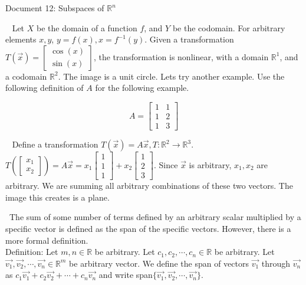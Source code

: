 \documentclass[11pt]{article}
\begin{document}
\begin{center}
Document 12: Subspaces of $\mathbb{R}^n$
\end{center}

\setlength{\leftskip}{0in}
$\,\,\,$ Let $X$ be the domain of a function $f$, and $Y$ be the codomain. For arbitrary elements $x,y$, $y=f(x),x=f^{-1}(y)$. Given a transformation $T(\vec{x})=\begin{bmatrix}\cos(x)\\\sin(x)\end{bmatrix}$, the transformation is nonlinear, with a domain $\mathbb{R}^1$, and a codomain $\mathbb{R}^2$. The image is a unit circle. Lets try another example. Use the following definition of $A$ for the following example.

$$A=\begin{bmatrix}
1 & 1\\1 & 2\\1 & 3
\end{bmatrix}$$

$\,\,\,$ Define a transformation $T(\vec{x})=A\vec{x},T:\mathbb{R}^2\rightarrow\mathbb{R}^3$. $T\left(\begin{bmatrix}x_1\\x_2\end{bmatrix}\right)=A\vec{x}=x_1\begin{bmatrix}1\\1\\1\end{bmatrix}+x_2\begin{bmatrix}1\\2\\3\end{bmatrix}$. Since $\vec{x}$ is arbitrary, $x_1,x_2$ are arbitrary. We are summing all arbitrary combinations of these two vectors. The image this creates is a plane.

$\,\,\,$The sum of some number of terms defined by an arbitrary scalar multiplied by a specific vector is defined as the span of the specific vectors. However, there is a more formal definition.\\

Definition: Let $m,n\in\mathbb{R}$ be arbitrary. Let $c_1,c_2,\cdots,c_n\in\mathbb{R}$ be arbitrary. Let $\vec{v_1},\vec{v_2},\cdots,\vec{v_n}\in\mathbb{R}^m$ be arbitrary vector. We define the span of vectors $\vec{v_1}$ through $\vec{v_n}$ as $c_1\vec{v_1}+c_2\vec{v_2}+\cdots+c_n\vec{v_n}$ and write span$\lbrace\vec{v_1},\vec{v_2},\cdots,\vec{v_n}\rbrace$.\\
\end{document}
